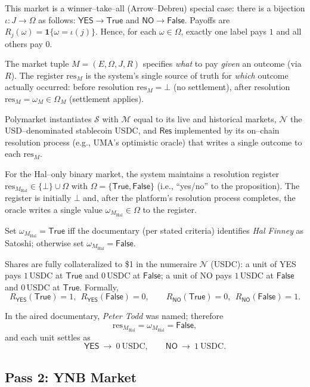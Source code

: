 This market is a winner--take--all (Arrow--Debreu) special case: there is a bijection $\iota:J\to\Omega$ as follows: $\textsf{YES}\rightarrow\mathsf{True}$ and $\textsf{NO}\rightarrow\mathsf{False}$. Payoffs are $R_j(\omega)=\mathbf{1}\{\omega=\iota(j)\}$. Hence, for each $\omega\in\Omega$, exactly one label pays $1$ and all others pay $0$. 

The market tuple $M=(E,\Omega,J,R)$ specifies \emph{what} to pay \emph{given} an outcome (via $R$).
The register $\mathrm{res}_M$ is the system’s single source of truth for \emph{which} outcome actually occurred:
before resolution $\mathrm{res}_M=\bot$ (no settlement), after resolution $\mathrm{res}_M=\omega_M\in\Omega_M$ (settlement applies).

Polymarket instantiates $\mathcal{S}$ with $\mathcal{M}$ equal to its live and historical markets, $\mathcal{N}$ the USD–denominated stablecoin USDC, and $\mathsf{Res}$ implemented by its on–chain resolution process (e.g., UMA’s optimistic oracle) that writes a single outcome to each $\mathrm{res}_M$.

For the Hal–only binary market, the system maintains a resolution register
$\mathrm{res}_{M_{\mathrm{Hal}}}\in\{\bot\}\cup\Omega$ with
$\Omega=\{\mathsf{True},\mathsf{False}\}$ (i.e., “yes/no” to the proposition).
The register is initially $\bot$ and, after the platform’s resolution process completes, the oracle writes a single value
$\omega_{M_{\mathrm{Hal}}}\in\Omega$ to the register.

Set $\omega_{M_{\mathrm{Hal}}}=\mathsf{True}$ iff the documentary (per stated criteria) identifies \emph{Hal Finney} as Satoshi; otherwise set $\omega_{M_{\mathrm{Hal}}}=\mathsf{False}$.

Shares are fully collateralized to \$1 in the numeraire $\mathcal{N}$ (USDC): a unit of \textsf{YES} pays $1$\,USDC at $\mathsf{True}$ and $0$\,USDC at $\mathsf{False}$; a unit of \textsf{NO} pays $1$\,USDC at $\mathsf{False}$ and $0$\,USDC at $\mathsf{True}$. Formally,
\[
R_{\textsf{YES}}(\mathsf{True})=1,\ \ R_{\textsf{YES}}(\mathsf{False})=0,\qquad
R_{\textsf{NO}}(\mathsf{True})=0,\ \ R_{\textsf{NO}}(\mathsf{False})=1.
\]

In the aired documentary, \emph{Peter Todd} was named; therefore
\[
\mathrm{res}_{M_{\mathrm{Hal}}}=\omega_{M_{\mathrm{Hal}}}=\mathsf{False},
\]
and each unit settles as
\[
\textsf{YES}\ \to\ 0\ \text{USDC},\qquad
\textsf{NO}\ \to\ 1\ \text{USDC}.
\]


\subsection{Pass 2: YNB Market}


